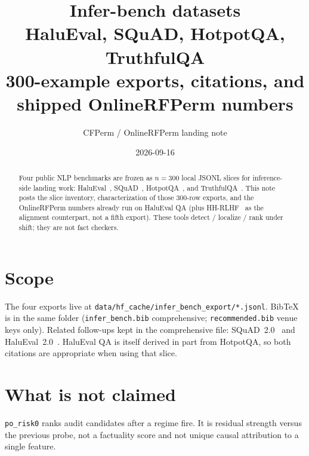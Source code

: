 \documentclass[11pt,a4paper]{article}
\title{\textbf{Infer-bench datasets}\\[0.3em]
\large HaluEval, SQuAD, HotpotQA, TruthfulQA\\
300-example exports, citations, and shipped OnlineRFPerm numbers}
\author{CFPerm / OnlineRFPerm landing note}
\date{2026-09-16}
\begin{document}
\maketitle
\begin{abstract}
Four public NLP benchmarks are frozen as $n=300$ local JSONL slices for inference-side landing work:
HaluEval~\citep{li-etal-2023-halueval},
SQuAD~\citep{rajpurkar-etal-2016-squad},
HotpotQA~\citep{yang-etal-2018-hotpotqa},
and TruthfulQA~\citep{lin-etal-2022-truthfulqa}.
This note posts the slice inventory, characterization of those 300-row exports, and the OnlineRFPerm numbers already run on HaluEval QA (plus HH-RLHF~\citep{bai2022hh-rlhf} as the alignment counterpart, not a fifth export).
These tools detect / localize / rank under shift; they are not fact checkers.
\end{abstract}

\section{Scope}
The four exports live at \texttt{data/hf\_cache/infer\_bench\_export/*.jsonl}.
BibTeX is in the same folder (\texttt{infer\_bench.bib} comprehensive; \texttt{recommended.bib} venue keys only).
Related follow-ups kept in the comprehensive file: SQuAD~2.0~\citep{rajpurkar-etal-2018-know} and HaluEval~2.0~\citep{li-etal-2024-dawn}.
HaluEval QA is itself derived in part from HotpotQA, so both citations are appropriate when using that slice.



\section{What is not claimed}
\texttt{po\_risk0} ranks audit candidates after a regime fire.
It is residual strength versus the previous probe, not a factuality score and not unique causal attribution to a single feature.



\end{document}
